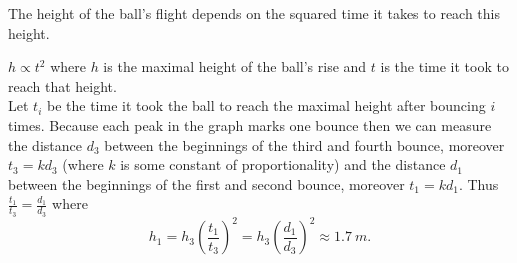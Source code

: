 {\ifEngHint
The height of the ball’s flight depends on the squared time it takes to reach this height.
\fi


\ifEngSolution
$h \propto t^{2}$ where $h$ is the maximal height of the ball’s rise and $t$ is the time it took to reach that height.\\
Let $t_{i}$ be the time it took the ball to reach the maximal height after bouncing $i$ times. Because each peak in the graph marks one bounce then we can measure the distance $d_{3}$ between the beginnings of the third and fourth bounce, moreover $t_{3}=kd_{3}$ (where $k$ is some constant of proportionality) and the distance $d_{1}$ between the beginnings of the first and second bounce, moreover $t_{1}=kd_{1}$. Thus $\frac{t_{1}}{t_{3}}=\frac{d_{1}}{d_{3}}$ where 
$$h_{1}=h_{3}(\frac{t_{1}}{t_{3}})^{2}=h_{3}(\frac{d_{1}}{d_{3}})^{2} \approx \SI{1,7}{m}.$$
\fi
}